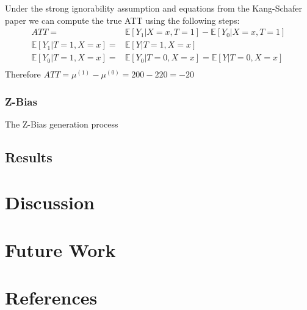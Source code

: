 \documentclass{article}
\begin{document}
Under the strong ignorability assumption and equations from the Kang-Schafer paper we can compute the true ATT using the following steps:
\begin{equation*}
    \begin{split}
        ATT = & \mathbb{E}[Y_1 | X=x, T=1] - \mathbb{E}[Y_0 | X=x, T=1] \\
        \mathbb{E}[Y_1|T=1, X=x] = & \mathbb{E}[Y|T=1, X=x] \\
        \mathbb{E}[Y_0|T=1, X=x] = & \mathbb{E}[Y_0|T=0, X=x] = \mathbb{E}[Y|T=0, X=x] \\
    \end{split}
\end{equation*}
Therefore $ATT=\mu{}^{(1)} - \mu{}^{(0)} = 200-220 = -20$ 

\subsubsection{Z-Bias}

The Z-Bias generation process \cite{myers2011effects}

\subsection{Results}


\section{Discussion}

\section{Future Work}

\section{References}



\end{document}
